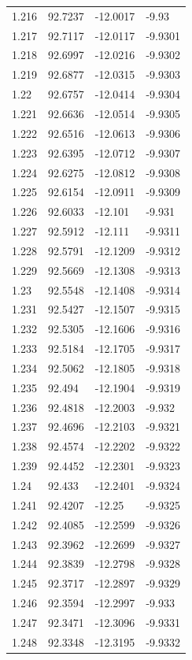 \begin{tabular}{llll}
1.216 & 92.7237 & -12.0017 & -9.93 \\
1.217 & 92.7117 & -12.0117 & -9.9301 \\
1.218 & 92.6997 & -12.0216 & -9.9302 \\
1.219 & 92.6877 & -12.0315 & -9.9303 \\
1.22 & 92.6757 & -12.0414 & -9.9304 \\
1.221 & 92.6636 & -12.0514 & -9.9305 \\
1.222 & 92.6516 & -12.0613 & -9.9306 \\
1.223 & 92.6395 & -12.0712 & -9.9307 \\
1.224 & 92.6275 & -12.0812 & -9.9308 \\
1.225 & 92.6154 & -12.0911 & -9.9309 \\
1.226 & 92.6033 & -12.101 & -9.931 \\
1.227 & 92.5912 & -12.111 & -9.9311 \\
1.228 & 92.5791 & -12.1209 & -9.9312 \\
1.229 & 92.5669 & -12.1308 & -9.9313 \\
1.23 & 92.5548 & -12.1408 & -9.9314 \\
1.231 & 92.5427 & -12.1507 & -9.9315 \\
1.232 & 92.5305 & -12.1606 & -9.9316 \\
1.233 & 92.5184 & -12.1705 & -9.9317 \\
1.234 & 92.5062 & -12.1805 & -9.9318 \\
1.235 & 92.494 & -12.1904 & -9.9319 \\
1.236 & 92.4818 & -12.2003 & -9.932 \\
1.237 & 92.4696 & -12.2103 & -9.9321 \\
1.238 & 92.4574 & -12.2202 & -9.9322 \\
1.239 & 92.4452 & -12.2301 & -9.9323 \\
1.24 & 92.433 & -12.2401 & -9.9324 \\
1.241 & 92.4207 & -12.25 & -9.9325 \\
1.242 & 92.4085 & -12.2599 & -9.9326 \\
1.243 & 92.3962 & -12.2699 & -9.9327 \\
1.244 & 92.3839 & -12.2798 & -9.9328 \\
1.245 & 92.3717 & -12.2897 & -9.9329 \\
1.246 & 92.3594 & -12.2997 & -9.933 \\
1.247 & 92.3471 & -12.3096 & -9.9331 \\
1.248 & 92.3348 & -12.3195 & -9.9332 \\

\end{tabular}
